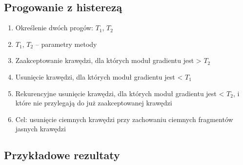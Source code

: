 \documentclass[a4paper,twocolumn,12pt]{article}
\begin{document}
\subsection{Progowanie z histerezą}

\begin{enumerate}
 \item Określenie dwóch progów: $T_1$, $T_2$
 \item $T_1$, $T_2$ – parametry  metody
 \item Zaakceptowanie krawędzi, dla których moduł gradientu jest > $T_2$
 \item Usunięcie krawędzi, dla których moduł gradientu jest < $T_1$
 \item Rekurencyjne usunięcie krawędzi, dla których moduł gradientu jest < $T_2$, i które nie przylegają do już zaakceptowanej krawędzi
 \item Cel: usunięcie ciemnych krawędzi przy zachowaniu ciemnych fragmentów jasnych krawędzi
\end{enumerate}


\subsection{Przykładowe rezultaty}
\end{document}

